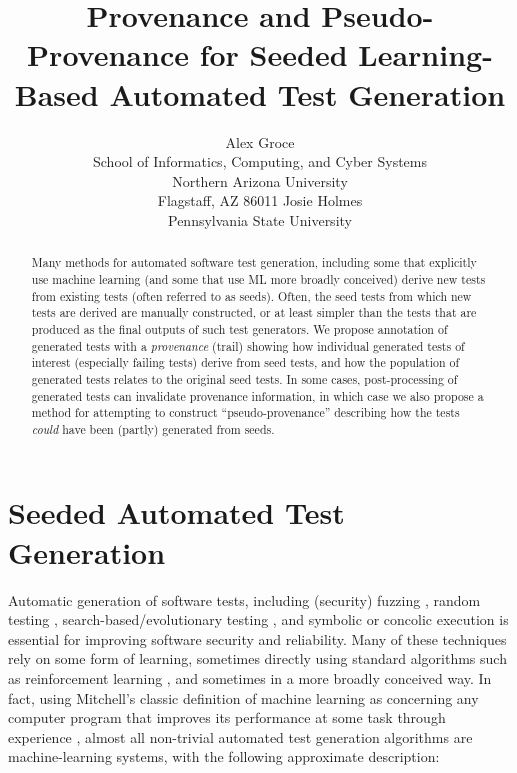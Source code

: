 \documentclass[final]{article}
\title{Provenance and Pseudo-Provenance for Seeded Learning-Based Automated Test Generation}
\author{
Alex Groce\\
School of Informatics, Computing, and Cyber Systems\\
Northern Arizona University\\
Flagstaff, AZ 86011
\And
Josie Holmes\\
Pennsylvania State University 
}
\begin{document}

\maketitle

\begin{abstract}
  Many methods for automated software test generation, including some that
  explicitly use machine learning (and some that use ML more broadly
  conceived) derive new tests from existing tests (often referred to
  as seeds).  Often, the seed tests
  from which new tests are derived are manually constructed, or at least
  simpler than the tests that are produced as the final outputs of
  such test generators.  We
  propose annotation of generated tests with a \emph{provenance} (trail) showing
  how individual generated tests of interest (especially failing tests) derive
  from seed tests, and how the population of generated tests relates
  to the original seed tests.  In some cases, post-processing of
  generated tests can invalidate provenance information, in which case
  we also propose a method for attempting to construct
  ``pseudo-provenance'' describing how the tests \emph{could} have
  been (partly) generated from seeds.
\end{abstract}

\section{Seeded Automated Test Generation}

Automatic generation of software tests, including (security) fuzzing
\cite{aflfuzz,TrailBitsSeeded}, random testing \cite{csmith,ICSEDiff,Pacheco},
search-based/evolutionary testing \cite{FA11},
and symbolic or concolic execution
\cite{Whitebox,GodefroidKS05,KLEE,Person:2011:DIS:1993498.1993558,Marinescu:2012:MTS:2337223.2337308,issta14}
is essential for improving software security and reliability.  Many of
these techniques rely on some form of learning, sometimes directly
using standard algorithms
\cite{last2004artificial,Raffelt:2007:DTV:1787497.1787516,ARTChen,Groce:2002:AMC:646486.694482}
such as reinforcement learning \cite{ISSRE,ISOLA12,ReinforceBook}, and sometimes in a more broadly conceived
way.  In fact, using Mitchell's classic definition of machine learning
as concerning any computer program that improves its performance at some
task through experience \cite{Mitchell}, almost all non-trivial automated test generation
algorithms are machine-learning systems, with the following
approximate description:
\end{document}
